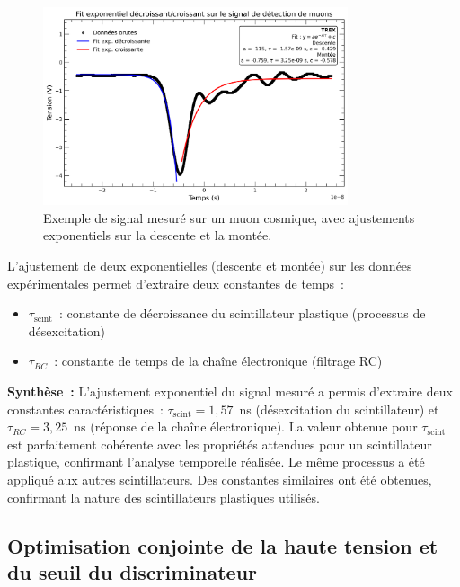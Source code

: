 \documentclass[a4paper,12pt,twoside]{article}
\begin{document}
\begin{figure}[H]
    \centering
    \includegraphics[width=0.8\textwidth]{Images/Desexitation_Scintillateur_2.png}
    \caption{Exemple de signal mesuré sur un muon cosmique, avec ajustements exponentiels sur la descente et la montée.}
    \label{fig:signal-muon}
\end{figure}

L’ajustement de deux exponentielles (descente et montée) sur les données expérimentales permet d’extraire deux constantes de temps :
\begin{itemize}
    \item $\tau_{\text{scint}}$ : constante de décroissance du scintillateur plastique (processus de désexcitation)
    \item $\tau_{RC}$ : constante de temps de la chaîne électronique (filtrage RC)
\end{itemize}

\begin{remarque}
\textbf{Synthèse~:} L’ajustement exponentiel du signal mesuré a permis d’extraire deux constantes caractéristiques~: $\tau_{\text{scint}} = 1{,}57$~ns (désexcitation du scintillateur) et $\tau_{RC} = 3{,}25$~ns (réponse de la chaîne électronique). La valeur obtenue pour $\tau_{\text{scint}}$ est parfaitement cohérente avec les propriétés attendues pour un scintillateur plastique, confirmant l’analyse temporelle réalisée.
Le même processus a été appliqué aux autres scintillateurs. Des constantes similaires ont été obtenues, confirmant la nature des scintillateurs plastiques utilisés.
\end{remarque}



\subsection{Optimisation conjointe de la haute tension et du seuil du discriminateur}
\end{document}
